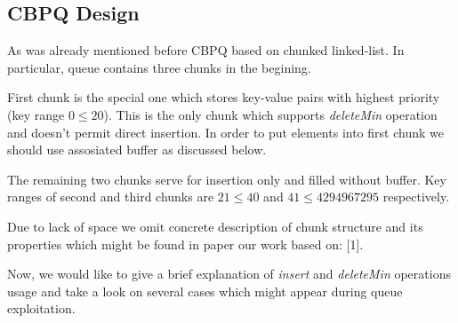 \documentclass{article}
\begin{document}
\subsection{CBPQ Design}
As was already mentioned before CBPQ based on chunked linked-list. In particular, queue contains three chunks in the begining.\par
First chunk is the special one which stores key-value pairs with highest priority (key range $0 \leqslant 20$). This is the only chunk which supports \textit{deleteMin} operation and doesn't permit direct insertion. In order to put elements into first chunk we should use assosiated buffer as discussed below.\par
The remaining two chunks serve for insertion only and filled without buffer. Key ranges of second and third chunks are $21 \leqslant 40$ and $41 \leqslant 4294967295$ respectively.\par
Due to lack of space we omit concrete description of chunk structure and its properties which might be found in paper our work based on: [1].\par
Now, we would like to give a brief explanation of \textit{insert} and \textit{deleteMin} operations usage and take a look on several cases which might appear during queue exploitation.
\end{document}
